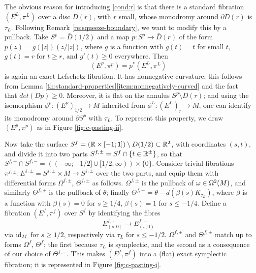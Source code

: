 \documentclass[10pt,letterpaper]{article}
\begin{document}
%
The obvious reason for introducing \ref{cond:r} is that there is a standard
fibration $(E^L,\pi^L)$ over a disc $\bar{D}(r)$, with $r$ small, whose
monodromy around $\partial \bar{D}(r)$ is $\tau_L$. Following Remark
\ref{re:squeeze-boundary}, we want to modify this by a pullback. Take $S^p =
\bar{D}(1/2)$ and a map $p: S^p \rightarrow \bar{D}(r)$ of the form $p(z) =
g(|z|)(z/|z|)$, where $g$ is a function with $g(t) = t$ for small $t$, $g(t) =
r$ for $t \geq r$, and $g'(t) \geq 0$ everywhere. Then
\[
(E^p,\pi^p) = p^*(E^L,\pi^L)
\]
is again an exact Lefschetz fibration. It has nonnegative curvature; this
follows from Lemma \ref{th:standard-properties}\ref{item:nonnegatively-curved}
and the fact that $det(Dp) \geq 0$. Moreover, it is flat on the annulus $S^p
\setminus D(r)$; and using the isomorphism $\phi^p: (E^p)_{1/2} \rightarrow M$
inherited from $\phi^L: (E^L)_r \rightarrow M$, one can identify its monodromy
around $\partial S^p$ with $\tau_L$. To represent this property, we draw
$(E^p,\pi^p)$ as in Figure \ref{fig:c-pasting-ii}.

%
Now take the surface $S^f = (\mathbb{R} \times [-1;1]) \setminus D(1/2) \subset \mathbb{R}^2$,
with coordinates $(s,t)$, and divide it into two parts $S^{f,\pm} = S^f \cap \{
t \in \mathbb{R}^{\pm} \}$, so that $S^{f,+} \cap S^{f,-} = ((-\infty;-1/2] \cup
[1/2;\infty)) \times \{0\}$. Consider trivial fibrations $\pi^{f,\pm}:
E^{f,\pm} = S^{f,\pm} \times M \rightarrow S^{f,\pm}$ over the two parts, and
equip them with differential forms $\Omega^{f,\pm}$, $\Theta^{f,\pm}$ as
follows. $\Omega^{f,\pm}$ is the pullback of $\omega \in \Omega^2(M)$, and
similarly $\Theta^{f,+}$ is the pullback of $\theta$; finally $\Theta^{f,-} =
\theta - d(\beta(s)K_{\tau_L})$, where $\beta$ is a function with $\beta(s) =
0$ for $s \geq 1/4$, $\beta(s) = 1$ for $s \leq -1/4$. Define a fibration
$(E^f,\pi^f)$ over $S^f$ by identifying the fibres
\[
E^{f,+}_{(s,0)} \longrightarrow E^{f,-}_{(s,0)}
\]
via $\mathrm{id}_M$ for $s \geq 1/2$, respectively via $\tau_L$ for $s \leq -1/2$.
$\Omega^{f,\pm}$ and $\Theta^{f,\pm}$ match up to forms $\Omega^f$, $\Theta^f$;
the first because $\tau_L$ is symplectic, and the second as a consequence of
our choice of $\Theta^{f,-}$. This makes $(E^f,\pi^f)$ into a (flat) exact
symplectic fibration; it is represented in Figure \ref{fig:c-pasting-i}.
\end{document}
